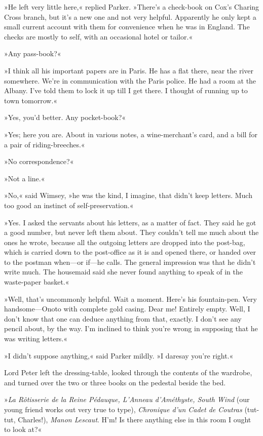 »He left very little here,« replied Parker. »There's a check-book on Cox's Charing Cross branch, but it's a new one and not very helpful. Apparently he only kept a small current account with them for convenience when he was in England. The checks are mostly to self, with an occasional hotel or tailor.«

»Any pass-book?«

»I think all his important papers are in Paris. He has a flat there, near the river somewhere. We're in communication with the Paris police. He had a room at the Albany. I've told them to lock it up till I get there. I thought of running up to town tomorrow.«

»Yes, you'd better. Any pocket-book?«

»Yes; here you are. About  in various notes, a wine-merchant's card, and a bill for a pair of riding-breeches.«

»No correspondence?«

»Not a line.«

»No,« said Wimsey, »he was the kind, I imagine, that didn't keep letters. Much too good an instinct of self-preservation.«

»Yes. I asked the servants about his letters, as a matter of fact. They said he got a good number, but never left them about. They couldn't tell me much about the ones he wrote, because all the outgoing letters are dropped into the post-bag, which is carried down to the post-office as it is and opened there, or handed over to the postman when—or if—he calls. The general impression was that he didn't write much. The housemaid said she never found anything to speak of in the waste-paper basket.«

»Well, that's uncommonly helpful. Wait a moment. Here's his fountain-pen. Very handsome—Onoto with complete gold casing. Dear me! Entirely empty. Well, I don't know that one can deduce anything from that, exactly. I don't see any pencil about, by the way. I'm inclined to think you're wrong in supposing that he was writing letters.«

»I didn't suppose anything,« said Parker mildly. »I daresay you're right.«

Lord Peter left the dressing-table, looked through the contents of the wardrobe, and turned over the two or three books on the pedestal beside the bed.

»\foreignlanguage{french}{\textit{La Rôtisserie de la Reine Pédauque, L'Anneau d'Améthyste, South Wind}} (our young friend works out very true to type), \foreignlanguage{french}{\textit{Chronique d'un Cadet de Coutras}} (tut-tut, Charles!), \textit{Manon Lescaut}. H'm! Is there anything else in this room I ought to look at?«

